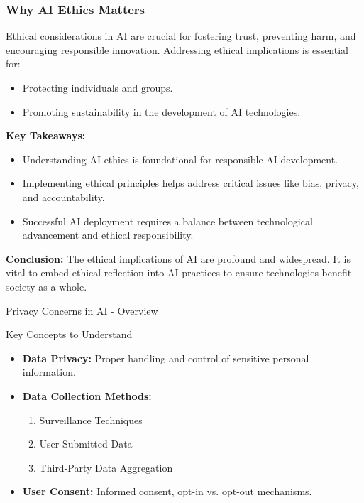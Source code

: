 \documentclass[aspectratio=169]{beamer}
\begin{document}
\begin{frame}[fragile]
    \frametitle{Why AI Ethics Matters}
    Ethical considerations in AI are crucial for fostering trust, preventing harm, and encouraging responsible innovation. Addressing ethical implications is essential for:
    \begin{itemize}
        \item Protecting individuals and groups.
        \item Promoting sustainability in the development of AI technologies.
    \end{itemize}
    
    \textbf{Key Takeaways:}
    \begin{itemize}
        \item Understanding AI ethics is foundational for responsible AI development.
        \item Implementing ethical principles helps address critical issues like bias, privacy, and accountability.
        \item Successful AI deployment requires a balance between technological advancement and ethical responsibility. 
    \end{itemize}
    
    \textbf{Conclusion:} 
    The ethical implications of AI are profound and widespread. It is vital to embed ethical reflection into AI practices to ensure technologies benefit society as a whole.
\end{frame}

\begin{frame}[fragile]{Privacy Concerns in AI - Overview}
    \begin{block}{Key Concepts to Understand}
        \begin{itemize}
            \item \textbf{Data Privacy:} Proper handling and control of sensitive personal information.
            \item \textbf{Data Collection Methods:}
            \begin{enumerate}
                \item Surveillance Techniques
                \item User-Submitted Data
                \item Third-Party Data Aggregation
            \end{enumerate}
            \item \textbf{User Consent:} Informed consent, opt-in vs. opt-out mechanisms.
        \end{itemize}
    \end{block}
\end{frame}
\end{document}
